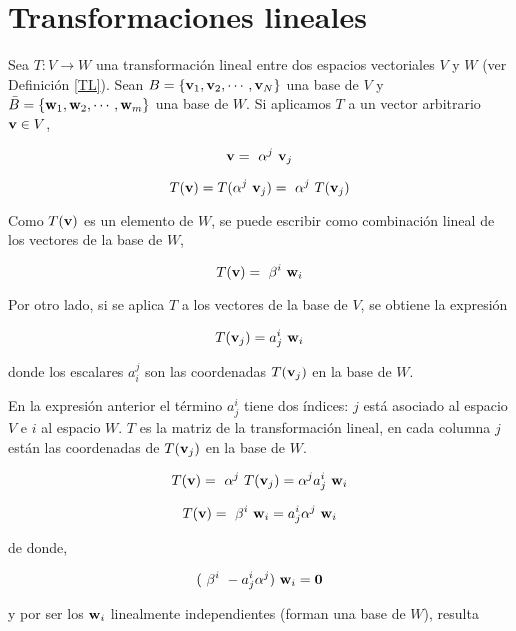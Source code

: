 \section{ Transformaciones lineales}



Sea $T: V \rightarrow W$ una transformación lineal entre dos espacios vectoriales $V$ y $W$ (ver Definición \ref{TL}).
Sean $B= \left\{\bold{v}_1,\bold{v}_2,\cdots, \bold{v}_N\right\}$ una base  de $V$ y $\bar{B}= \left\{\bold{w}_1,\bold{w}_2,\cdots, \bold{w}_m\right\}$ una base  de $W$. Si aplicamos $T$ a un vector arbitrario $\bold{v}\in V$, 



$$\bold{v}= ~\alpha^j~\bold{v}_j$$



$$T(\bold{v})= T(\alpha^j~\bold{v}_j)= ~\alpha^j~T(\bold{v}_j)$$

\bigskip

Como $T(\bold{v})$ es un elemento de $W$, se puede escribir como combinación lineal de los vectores de la base de $W$, 



$$T(\bold{v})= ~\beta^i~\bold{w}_i$$

\bigskip
Por otro lado, si se aplica $T$ a los vectores de la base de $V$, se obtiene la expresión 

 $$T(\bold{v}_j)=a_j^i~\bold{w}_i$$

\bigskip
\noindent
donde los escalares $a_i^j$ son las coordenadas $T(\bold{v}_j)$ en la base de $W$. 


En la expresión  anterior   el término $a_j^i$  tiene dos índices: $j$ está asociado al espacio  $V$ e $i$ al espacio $W$. $T$ es la matriz de la transformación lineal, en cada columna $j$ están las coordenadas de $T(\bold{v}_j)$ en la base de $W$.


$$T(\bold{v})=~\alpha^j~T(\bold{v}_j)= \alpha^j a_j^i~\bold{w}_i$$



$$T(\bold{v})= ~\beta^i~\bold{w}_i= a_j^i \alpha^j ~\bold{w}_i$$

\bigskip


\noindent
de donde,
 


$$ (~\beta^i~ - a_j^i \alpha^j ) ~\bold{w}_i=\bold{0}$$

\bigskip


\noindent
y por ser los $\bold{w}_i$ linealmente independientes (forman una base de $W$), resulta 



